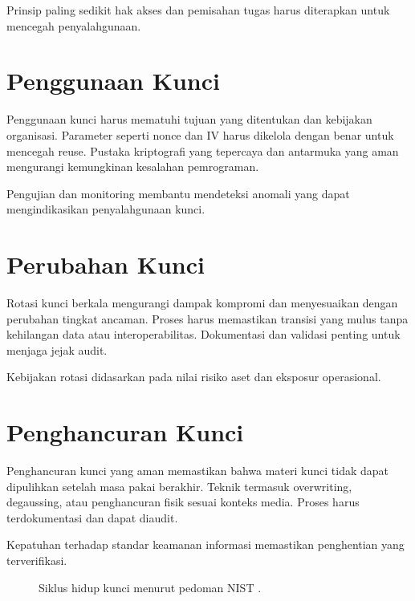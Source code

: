 \documentclass[../main.tex]{subfiles}
\begin{document}
Prinsip paling sedikit hak akses dan pemisahan tugas harus diterapkan untuk mencegah penyalahgunaan.

\section{Penggunaan Kunci}
Penggunaan kunci harus mematuhi tujuan yang ditentukan dan kebijakan organisasi. Parameter seperti nonce dan IV harus dikelola dengan benar untuk mencegah reuse. Pustaka kriptografi yang tepercaya dan antarmuka yang aman mengurangi kemungkinan kesalahan pemrograman.

Pengujian dan monitoring membantu mendeteksi anomali yang dapat mengindikasikan penyalahgunaan kunci.

\section{Perubahan Kunci}
Rotasi kunci berkala mengurangi dampak kompromi dan menyesuaikan dengan perubahan tingkat ancaman. Proses harus memastikan transisi yang mulus tanpa kehilangan data atau interoperabilitas. Dokumentasi dan validasi penting untuk menjaga jejak audit.

Kebijakan rotasi didasarkan pada nilai risiko aset dan eksposur operasional.

\section{Penghancuran Kunci}
Penghancuran kunci yang aman memastikan bahwa materi kunci tidak dapat dipulihkan setelah masa pakai berakhir. Teknik termasuk overwriting, degaussing, atau penghancuran fisik sesuai konteks media. Proses harus terdokumentasi dan dapat diaudit.

Kepatuhan terhadap standar keamanan informasi memastikan penghentian yang terverifikasi.

\begin{figure}[h]
\centering
{}
\caption{Siklus hidup kunci menurut pedoman NIST \parencite{nist80057p1}.}
\label{fig:key-lifecycle}
\end{figure}
\end{document}
